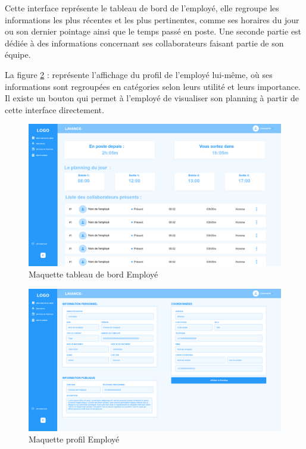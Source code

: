 Cette interface représente le tableau de bord de l’employé, elle regroupe les
informations les plus récentes et les plus pertinentes, comme ses horaires du
jour ou son dernier pointage ainsi que le temps passé en poste. Une seconde
partie est dédiée à des informations concernant ses collaborateurs faisant
partie de son équipe.
        
La figure \ref{fig7} : représente l’affichage du profil de l’employé lui-même,
où ses informations sont regroupées en catégories selon leurs utilité et leurs
importance. Il existe un bouton qui permet à l’employé de visualiser son
planning à partir de cette interface directement. 

\clearpage
        
\begin{figure}[h!]
    \centering
    \includegraphics[width=18cm]{images/dash_emp.png}
    \caption{Maquette tableau de bord Employé}
    \label{fig6}
\end{figure}

\begin{figure}[h!]
    \centering
    \includegraphics[width=18cm]{images/profil.png}
    \caption{Maquette profil Employé}
    \label{fig7}    
\end{figure}
        
